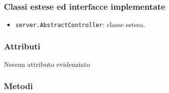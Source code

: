 \subsubsection*{Classi estese ed interfacce implementate}
\begin{itemize}
	\item \texttt{server.AbstractController}: classe estesa.
\end{itemize}

\subsubsection*{Attributi}

Nessun attributo evidenziato

\subsubsection*{Metodi}


